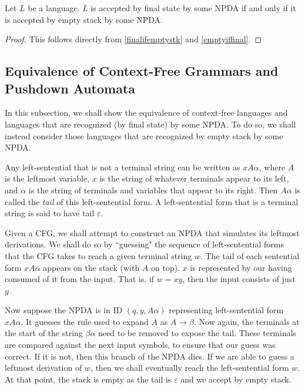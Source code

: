 \begin{theorem}
Let $L$ be a language. $L$ is accepted by final state by some NPDA if and only if it is accepted by empty stack by some NPDA.
\end{theorem}
\begin{proof}
This follows directly from \ref{finalifemptystk} and \ref{emptyiffinal}.
\end{proof}

\clearpage
\subsection{Equivalence of Context-Free Grammars and Pushdown Automata}

In this subsection, we shall show the equivalence of context-free languages and languages that are recognized (by final state) by some NPDA. To do so, we shall instead consider those languages that are recognized by empty stack by some NPDA.

\vspace{2mm}
Any left-sentential that is not a terminal string can be written as $xA\alpha$, where $A$ is the leftmost variable, $x$ is the string of whatever terminals appear to its left, and $\alpha$ is the string of terminals and variables that appear to its right. Then $A\alpha$ is called the \textit{tail} of this left-sentential form. A left-sentential form that is a terminal string is said to have tail $\varepsilon$.

\vspace{1mm}
Given a CFG, we shall attempt to construct an NPDA that simulates its leftmost derivations. We shall do so by ``guessing" the sequence of left-sentential forms that the CFG takes to reach a given terminal string $w$. The tail of each sentential form $xA\alpha$ appears on the stack (with $A$ on top). $x$ is represented by our having consumed of it from the input. That is, if $w=xy$, then the input consists of just $y$.

\vspace{1mm}
Now suppose the NPDA is in ID $(q,y,A\alpha)$ representing left-sentential form $xA\alpha$. It guesses the rule used to expand $A$ as $A\to\beta$. Now again, the terminals at the start of the string $\beta\alpha$ need to be removed to expose the tail. These terminals are compared against the next input symbols, to ensure that our guess was correct. If it is not, then this branch of the NPDA dies. If we are able to guess a leftmost derivation of $w$, then we shall eventually reach the left-sentential form $w$. At that point, the stack is empty as the tail is $\varepsilon$ and we accept by empty stack.

